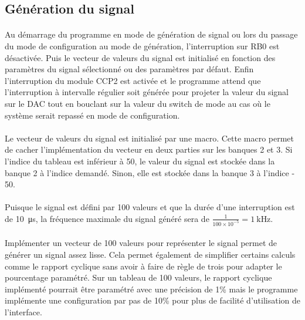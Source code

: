 \documentclass{article}
\begin{document}
    \subsection{Génération du signal}
    \paragraph{}
    Au démarrage du programme en mode de génération de signal ou lors du passage du mode de configuration au mode de génération, l'interruption sur RB0 est désactivée. Puis le vecteur de valeurs du signal est initialisé en fonction des paramètres du signal sélectionné ou des paramètres par défaut. Enfin l'interruption du module CCP2 est activée et le programme attend que l'interruption à intervalle régulier soit générée pour projeter la valeur du signal sur le DAC tout en bouclant sur la valeur du switch de mode au cas où le système serait repassé en mode de configuration.

    \paragraph{}
    Le vecteur de valeurs du signal est initialisé par une macro. Cette macro permet de cacher l'implémentation du vecteur en deux parties sur les banques 2 et 3. Si l'indice du tableau est inférieur à 50, le valeur du signal est stockée dans la banque 2 à l'indice demandé. Sinon, elle est stockée dans la banque 3 à l'indice - 50.

    \paragraph{}
    Puisque le signal est défini par 100 valeurs et que la durée d'une interruption est de \SI{10}{\micro\second}, la fréquence maximale du signal généré sera de $\frac{1}{100 \times 10^{-5}} = \SI{1}{\kilo\hertz}$.

    \paragraph{}
    Implémenter un vecteur de 100 valeurs pour représenter le signal permet de générer un signal assez lisse. Cela permet également de simplifier certains calculs comme le rapport cyclique sans avoir à faire de règle de trois pour adapter le pourcentage paramétré. Sur un tableau de 100 valeurs, le rapport cyclique implémenté pourrait être paramétré avec une précision de 1\% mais le programme implémente une configuration par pas de 10\% pour plus de facilité d'utilisation de l'interface.
\end{document}
